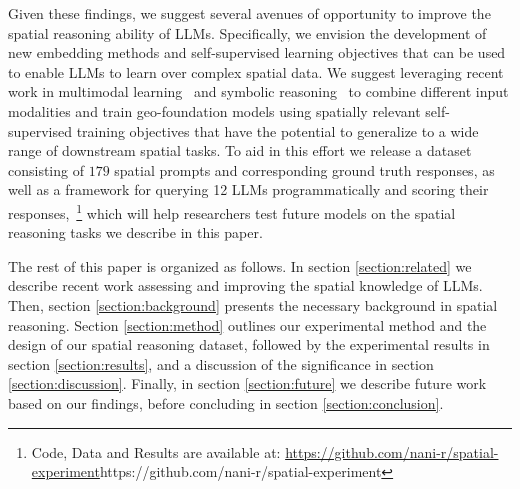 Given these findings, we suggest several avenues of opportunity to improve the spatial reasoning ability of LLMs.
Specifically, we envision the development of new embedding methods and self-supervised learning objectives that can be used to enable LLMs to learn over complex spatial data.
We suggest leveraging recent work in multimodal learning~\cite{Xue2023, Trappolini2023} and symbolic reasoning~\cite{Lee2023} to combine different input modalities and train geo-foundation models using spatially relevant self-supervised training objectives that have the potential to generalize to a wide range of downstream spatial tasks.
To aid in this effort we release a dataset consisting of $179$ spatial prompts and corresponding ground truth responses, as well as a framework for querying 12 LLMs programmatically and scoring their responses,~\footnote{Code, Data and Results are available at: \url{https://github.com/nani-r/spatial-experiment}{https://github.com/nani-r/spatial-experiment}} which will help researchers test future models on the spatial reasoning tasks we describe in this paper. 



The rest of this paper is organized as follows.
In section \ref{section:related} we describe recent work assessing and improving the spatial knowledge of LLMs.
Then, section \ref{section:background} presents the necessary background in spatial reasoning.
Section \ref{section:method} outlines our experimental method and the design of our spatial reasoning dataset, followed by the experimental results in section \ref{section:results}, and a discussion of the significance in section \ref{section:discussion}.
Finally, in section \ref{section:future} we describe future work based on our findings, before concluding in section \ref{section:conclusion}. 
